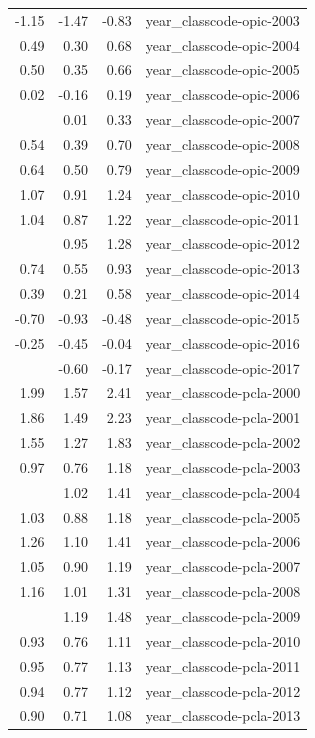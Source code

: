 \documentclass[]{article}
\begin{document}
\begin{longtable}[t]{rrrl}
-1.15 & -1.47 & -0.83 & year\_classcode-opic-2003\\
0.49 & 0.30 & 0.68 & year\_classcode-opic-2004\\
0.50 & 0.35 & 0.66 & year\_classcode-opic-2005\\
0.02 & -0.16 & 0.19 & year\_classcode-opic-2006\\
\addlinespace
0.17 & 0.01 & 0.33 & year\_classcode-opic-2007\\
0.54 & 0.39 & 0.70 & year\_classcode-opic-2008\\
0.64 & 0.50 & 0.79 & year\_classcode-opic-2009\\
1.07 & 0.91 & 1.24 & year\_classcode-opic-2010\\
1.04 & 0.87 & 1.22 & year\_classcode-opic-2011\\
\addlinespace
1.12 & 0.95 & 1.28 & year\_classcode-opic-2012\\
0.74 & 0.55 & 0.93 & year\_classcode-opic-2013\\
0.39 & 0.21 & 0.58 & year\_classcode-opic-2014\\
-0.70 & -0.93 & -0.48 & year\_classcode-opic-2015\\
-0.25 & -0.45 & -0.04 & year\_classcode-opic-2016\\
\addlinespace
-0.39 & -0.60 & -0.17 & year\_classcode-opic-2017\\
1.99 & 1.57 & 2.41 & year\_classcode-pcla-2000\\
1.86 & 1.49 & 2.23 & year\_classcode-pcla-2001\\
1.55 & 1.27 & 1.83 & year\_classcode-pcla-2002\\
0.97 & 0.76 & 1.18 & year\_classcode-pcla-2003\\
\addlinespace
1.21 & 1.02 & 1.41 & year\_classcode-pcla-2004\\
1.03 & 0.88 & 1.18 & year\_classcode-pcla-2005\\
1.26 & 1.10 & 1.41 & year\_classcode-pcla-2006\\
1.05 & 0.90 & 1.19 & year\_classcode-pcla-2007\\
1.16 & 1.01 & 1.31 & year\_classcode-pcla-2008\\
\addlinespace
1.34 & 1.19 & 1.48 & year\_classcode-pcla-2009\\
0.93 & 0.76 & 1.11 & year\_classcode-pcla-2010\\
0.95 & 0.77 & 1.13 & year\_classcode-pcla-2011\\
0.94 & 0.77 & 1.12 & year\_classcode-pcla-2012\\
0.90 & 0.71 & 1.08 & year\_classcode-pcla-2013\\

\end{longtable}
\end{document}
